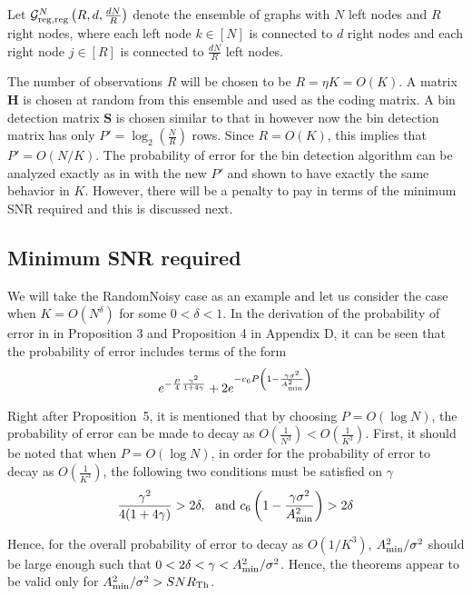 \documentclass[conference,onecolumn]{IEEEtran}
\begin{document}
\begin{definition}\label{def:leftandrighreg}
Let $\mathcal{G}^N_{\rm reg,reg}\left(R,d, \frac{dN}{R} \right)$ denote the ensemble of graphs with $N$ left nodes and $R$ right nodes, where each left node $k \in [N]$ is connected to $d$ right nodes and each right node $j \in [R]$ is connected to $\frac{dN}{R}$ left nodes.
\end{definition}

The number of observations $R$ will be chosen to be $R = \eta K = O(K)$. A matrix $\mathbf{H}$ is chosen at random from this ensemble and used as the coding matrix. A bin detection matrix $\mathbf{S}$ is chosen similar to that in \cite{li2015subdraft} however now the bin detection matrix has only $P' = \log_2 \left(\frac{N}{R}\right)$ rows. Since $R = O(K)$, this implies that $P' = O(N/K)$. The probability of error for the bin detection algorithm can be analyzed exactly as in \cite{li2015subdraft} with the new $P'$ and shown to have exactly the same behavior in $K$. However, there will be a penalty to pay in terms of the minimum SNR required and this is discussed next.

\subsection{Minimum SNR required}
We will take the RandomNoisy case as an example and let us consider the case when $K = O(N^\delta)$ for some $0 < \delta < 1$.  In the derivation of the probability of error in \cite{li2015subdraft} in Proposition 3 and Proposition 4 in Appendix D, it can be seen that the probability of error includes terms of the form
\[
e^{-\frac{P}{4} \frac{\gamma^2}{1+4\gamma}} + 2 e^{-c_6 P \left(1-\frac{\gamma \sigma^2}{A^2_{\rm min}} \right)}
\]

Right after Proposition~5, it is mentioned that by choosing $P = O(\log N)$, the probability of error can be made to decay as $O\left(\frac{1}{N^3} \right) <  O\left(\frac{1}{K^3} \right)$. First, it should be noted that when $P = O(\log N)$, in order for the probability of error to decay as $O\left(\frac{1}{K^3} \right)$, the following two conditions must be satisfied on $\gamma$
\[
\frac{\gamma^2}{4(1+4\gamma)} > 2 \delta, \ \ {\rm and} \ c_6 \left(1 - \frac{\gamma \sigma^2}{A_{\rm min}^2} \right) > 2 \delta
\]

Hence, for the overall probability of error to decay as $O(1/K^3)$, $A_{\rm min}^2/\sigma^2$ should be large enough such that $0 < 2 \delta < \gamma < A_{\rm min}^2/\sigma^2$. Hence, the theorems appear to be valid only for $A_{\rm min}^2/\sigma^2 > SNR_{\rm Th}$.
\end{document}
